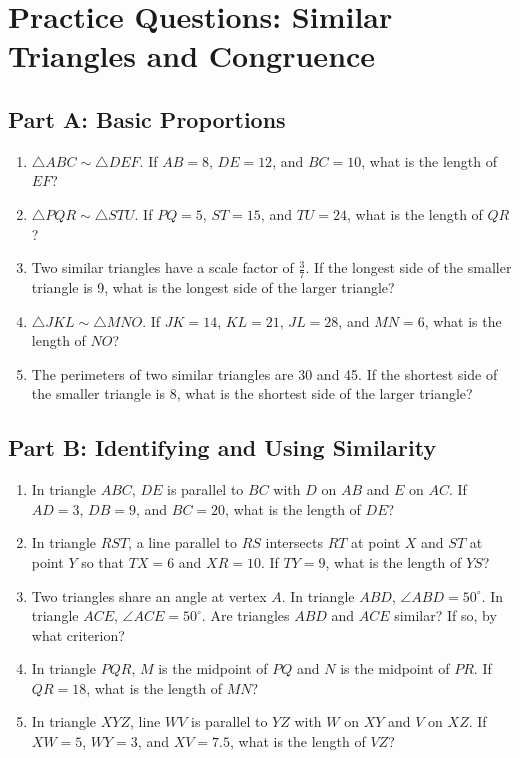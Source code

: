 \documentclass[14pt]{extarticle}
\begin{document}
\newpage

\section*{Practice Questions: Similar Triangles and Congruence}

\subsection*{Part A: Basic Proportions}
\begin{enumerate}
  \item \(\triangle ABC \sim \triangle DEF\). If \(AB = 8\), \(DE = 12\), and \(BC = 10\), what is the length of \(EF\)?
  \item \(\triangle PQR \sim \triangle STU\). If \(PQ = 5\), \(ST = 15\), and \(TU = 24\), what is the length of \(QR\)?
  \item Two similar triangles have a scale factor of \(\frac{3}{7}\). If the longest side of the smaller triangle is 9, what is the longest side of the larger triangle?
  \item \(\triangle JKL \sim \triangle MNO\). If \(JK = 14\), \(KL = 21\), \(JL = 28\), and \(MN = 6\), what is the length of \(NO\)?
  \item The perimeters of two similar triangles are 30 and 45. If the shortest side of the smaller triangle is 8, what is the shortest side of the larger triangle?
\end{enumerate}

\subsection*{Part B: Identifying and Using Similarity}
\begin{enumerate}
  \item In triangle \(ABC\), \(DE\) is parallel to \(BC\) with \(D\) on \(AB\) and \(E\) on \(AC\). If \(AD = 3\), \(DB = 9\), and \(BC = 20\), what is the length of \(DE\)?
  \item In triangle \(RST\), a line parallel to \(RS\) intersects \(RT\) at point \(X\) and \(ST\) at point \(Y\) so that \(TX = 6\) and \(XR = 10\). If \(TY = 9\), what is the length of \(YS\)?
  \item Two triangles share an angle at vertex \(A\). In triangle \(ABD\), \(\angle ABD = 50^\circ\). In triangle \(ACE\), \(\angle ACE = 50^\circ\). Are triangles \(ABD\) and \(ACE\) similar? If so, by what criterion?
  \item In triangle \(PQR\), \(M\) is the midpoint of \(PQ\) and \(N\) is the midpoint of \(PR\). If \(QR = 18\), what is the length of \(MN\)?
  \item In triangle \(XYZ\), line \(WV\) is parallel to \(YZ\) with \(W\) on \(XY\) and \(V\) on \(XZ\). If \(XW = 5\), \(WY = 3\), and \(XV = 7.5\), what is the length of \(VZ\)?
\end{enumerate}
\end{document}

